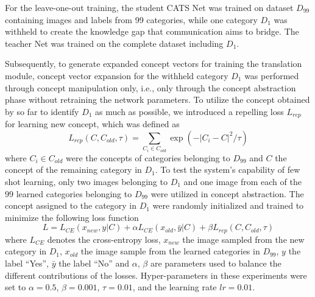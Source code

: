 \documentclass[pdflatex,sn-mathphys-num,lineno]{sn-jnl}%
\begin{document}
\begin{CJK}{UTF8}{gbsn}
For the leave-one-out training, the student CATS Net was trained on dataset $D_{99}$ containing images and labels from 99 categories, while one category $D_1$ was withheld to create the knowledge gap that communication aims to bridge. The teacher Net was trained on the complete dataset including $D_1$. 

Subsequently, to generate expanded concept vectors for training the translation module, concept vector expansion for the withheld category $D_1$ was performed through concept manipulation only, i.e., only through the concept abstraction phase without retraining the network parameters. To utilize the concept obtained by so far to identify $D_1$ as much as possible, we introduced a repelling loss $L_{rep}$ for learning new concept, which was defined as
\[
L_{rep}(C, C_{old}, \tau) = \sum_{C_i \in C_{old}} \exp (-|C_i - C|^2/\tau)
\]
where $C_i \in C_{old}$ were the concepts of categories belonging to $D_{99}$ and $C$ the concept of the remaining category in $D_1$. To test the system’s capability of few shot learning, only two images belonging to $D_1$ and one image from each of the $99$ learned categories belonging to $D_{99}$ were utilized in concept abstraction. The concept assigned to the category in $D_1$ were randomly initialized and trained to minimize the following loss function
\[
L = L_{CE}(x_{new},y|C) + \alpha L_{CE}(x_{old},\bar{y}|C) + \beta L_{rep}(C, C_{old}, \tau)
\]
where $L_{CE}$ denotes the cross-entropy loss, $x_{new}$ the image sampled from the new category in $D_1$, $x_{old}$ the image sample from the learned categories in $D_{99}$, $y$ the label “Yes”, $\bar{y}$ the label “No” and $\alpha$, $\beta$ are parameters used to balance the different contributions of the losses. Hyper-parameters in these experiments were set to $\alpha = 0.5$, $\beta = 0.001$, $\tau = 0.01$, and the learning rate $ lr = 0.01$. 


\end{CJK}
\end{document}
